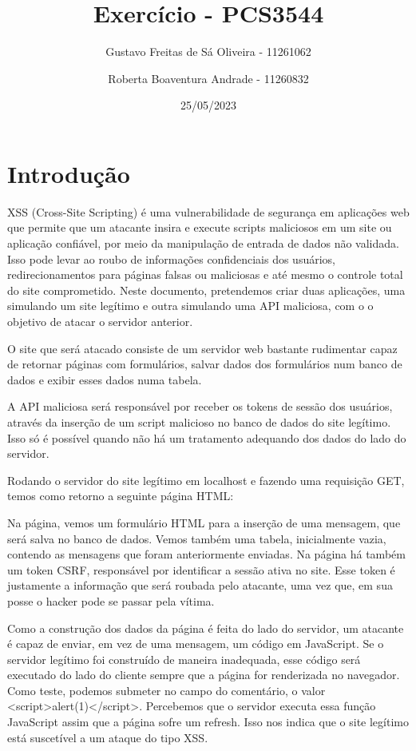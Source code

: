 \documentclass[11pt]{article}
\title{Exercício - PCS3544}
\author{
    Gustavo Freitas de Sá Oliveira - 11261062
    \and
    Roberta Boaventura Andrade - 11260832
}
\date{25/05/2023}
\begin{document}
\maketitle

\section{Introdução}

XSS (Cross-Site Scripting) é uma vulnerabilidade de segurança em aplicações web que permite que um atacante insira e execute scripts maliciosos em um site ou aplicação confiável, por meio da manipulação de entrada de dados não validada. Isso pode levar ao roubo de informações confidenciais dos usuários, redirecionamentos para páginas falsas ou maliciosas e até mesmo o controle total do site comprometido. Neste documento, pretendemos criar duas aplicações, uma simulando um site legítimo e outra simulando uma API maliciosa, com o o objetivo de atacar o servidor anterior.

O site que será atacado consiste de um servidor web bastante rudimentar capaz de retornar páginas com formulários, salvar dados dos formulários num banco de dados e exibir esses dados numa tabela.

A API maliciosa será responsável por receber os tokens de sessão dos usuários, através da inserção de um script malicioso no banco de dados do site legítimo. Isso só é possível quando não há um tratamento adequando dos dados do lado do servidor.

Rodando o servidor do site legítimo em localhost e fazendo uma requisição GET, temos como retorno a seguinte página HTML:



Na página, vemos um formulário HTML para a inserção de uma mensagem, que será salva no banco de dados. Vemos também uma tabela, inicialmente vazia, contendo as mensagens que foram anteriormente enviadas. Na página há também um token CSRF, responsável por identificar a sessão ativa no site. Esse token é justamente a informação que será roubada pelo atacante, uma vez que, em sua posse o hacker pode se passar pela vítima.

Como a construção dos dados da página é feita do lado do servidor, um atacante é capaz de enviar, em vez de uma mensagem, um código em JavaScript. Se o servidor legítimo foi construído de maneira inadequada, esse código será executado do lado do cliente sempre que a página for renderizada no navegador. Como teste, podemos submeter no campo do comentário, o valor \textless script\textgreater alert(1)\textless /script\textgreater. Percebemos que o servidor executa essa função JavaScript assim que a página sofre um refresh. Isso nos indica que o site legítimo está suscetível a um ataque do tipo XSS.
\end{document}
